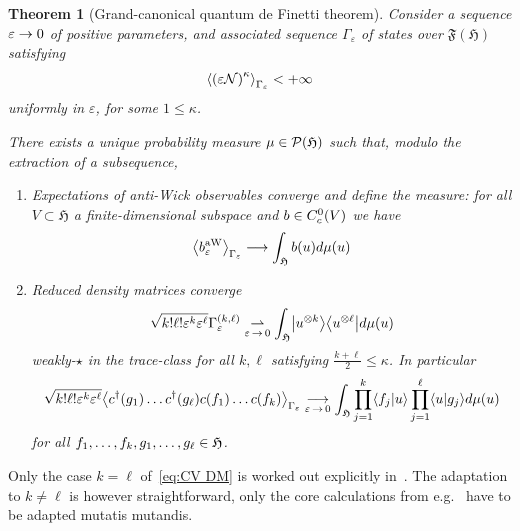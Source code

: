 \documentclass[10pt]{amsart}
\newtheorem{theo}{Theorem}[section]
\theoremstyle{definition}\newtheorem{defi}[theo]{Definition}\newtheorem{rema}[theo]{Remark}\newtheorem{exam}[theo]{Example}\newtheorem{exem}[theo]{Example}\newtheorem{nota}[theo]{Notation}
\newcommand{\wto}{\rightharpoonup}
\newcommand{\cN}{\mathcal{N}}
\newcommand{\gH}{\mathfrak{H}}
\newcommand{\gF}{\mathfrak{F}}
\newcommand{\cP}{\mathcal{P}}
\newcommand{\1}{\mathds{1}}
\newcommand{\eps}{\varepsilon}
\newcommand{\cda}{c^{\dagger}}
\let\oldin\in
\renewcommand{\in}{\mathchoice{\oldin}{\oldin}{\,\oldin\,}{\,\oldin\,}}
\renewcommand*{\to}{\mathchoice{\longrightarrow}{\rightarrow}{\rightarrow}{\rightarrow}}
\let\originalleft\left
\let\originalright\right
\renewcommand{\left}{\mathopen{}\mathclose\bgroup\originalleft}
\renewcommand{\right}{\aftergroup\egroup\originalright}
\begin{document}
\begin{theo}[{Grand-canonical quantum de Finetti theorem}]\label{thm:deF}
Consider a sequence $\eps \to 0$ of positive parameters, and associated sequence $\Gamma_\eps$ of states over $\gF(\gH)$ satisfying
\begin{equation*}
\left\langle \left(\eps \cN \right)^\kappa \right\rangle_{\Gamma_{\eps}} < + \infty
\end{equation*}
uniformly in $\eps$, for some $1 \leq \kappa$.

There exists a unique probability measure $\mu \in \cP (\gH)$ such that, modulo the extraction of a subsequence,
\begin{enumerate}
\item\label{theo4.5.1} Expectations of anti-Wick observables converge and define the measure: for all $V \subset \gH$ a finite-dimensional subspace and $b\in C^0_c (V)$ we have
\begin{equation}\label{eq:AW CV}
\left\langle b^{\rm aW}_{\eps} \right\rangle_{\Gamma_\eps} \to \int_{ \gH} b(u) d\mu (u)
\end{equation}
\item\label{theo4.5.2} Reduced density matrices converge
\begin{equation}\label{eq:CV DM}
\sqrt{k! \ell ! \eps ^k \eps^\ell}\Gamma_\eps ^{(k,\ell)} \underset{\eps\,\to\,0}{\wto} \int_{\gH} \left|u^{\otimes k} \right\rangle \left\langle u ^{\otimes \ell}\right| d\mu (u)
\end{equation}
weakly-$\star$ in the trace-class for all $k,\ell$ satisfying $\frac{k+\ell}{2} \leq \kappa$. In particular
\begin{equation*}
\sqrt{k! \ell ! \eps ^k \eps^\ell}\left\langle \cda (g_1) \ldots \cda (g_\ell) c (f_1) \ldots c(f_k) \right\rangle_{\Gamma_{\eps}} \underset{\eps\,\to\,0}{\to} \int_{\gH} \prod_{j=1} ^k \langle f_j | u \rangle \prod_{j=1}^\ell \langle u | g_j \rangle d\mu (u)
\end{equation*}
for all $f_1,\ldots,f_k,g_1,\ldots,g_\ell \in \gH$.
\end{enumerate}
\end{theo}

Only the case $k=\ell$ of~\eqref{eq:CV DM} is worked out explicitly in~\cite{LewNamRou-14d}. The adaptation to $k\neq \ell$ is however straightforward, only the core calculations from e.g.~\cite[Lemma~4.2]{LewNamRou-14b} have to be adapted mutatis mutandis.
\end{document}
